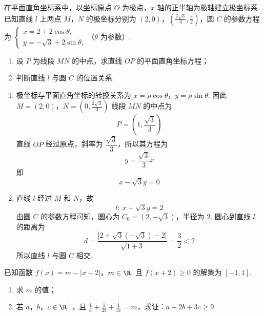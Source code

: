 \begin{problem}
在平面直角坐标系中，以坐标原点 \(O\) 为极点，\(x\) 轴的正半轴为极轴建立极坐标系. 已知直线 \(l\) 上两点 \(M\)，\(N\) 的极坐标分别为 \((2,0)\)，\(\left(\frac{2\sqrt{3}}{3},\frac{\pi}{2}\right)\)，圆 \(C\) 的参数方程为 \(\begin{cases}
x = 2 + 2\cos\theta,\\
y = -\sqrt{3} + 2\sin\theta,
\end{cases}\)（\(\theta\) 为参数）.

\begin{enumerate}
\item 设 \(P\) 为线段 \(MN\) 的中点，求直线 \(OP\) 的平面直角坐标方程；
\item 判断直线 \(l\) 与圆 \(C\) 的位置关系.
\end{enumerate}
\end{problem}

\begin{solution}
\begin{enumerate}
\item 极坐标与平面直角坐标的转换关系为 \(x=\rho\cos\theta\)，\(y=\rho\sin\theta\). 因此
\(M=(2,0)\)，\(N=\left(0,\frac{2\sqrt{3}}{3}\right)\)
线段 \(MN\) 的中点为
\[
P=\left(1,\frac{\sqrt{3}}{3}\right)
\]
直线 \(OP\) 经过原点，斜率为 \(\dfrac{\sqrt{3}}{3}\)，所以其方程为
\[
y=\frac{\sqrt{3}}{3}x
\]
即
\[
x-\sqrt{3}y=0
\]

\item 直线 \(l\) 经过 \(M\) 和 \(N\)，故
\[
l:\ x+\sqrt{3}y=2
\]
由圆 \(C\) 的参数方程可知，圆心为 \(C_{0}=(2,-\sqrt{3})\)，半径为 \(2\). 圆心到直线 \(l\) 的距离为
\[
d=\frac{|2+\sqrt{3}(-\sqrt{3})-2|}{\sqrt{1+3}}
=\frac{3}{2}<2
\]
所以直线 \(l\) 与圆 \(C\) 相交.
\end{enumerate}
\end{solution}

\begin{problem}
已知函数 \(f(x) = m - |x - 2|\)，\(m \in \R\). 且 \(f(x + 2) \geqslant 0\) 的解集为 \([-1,1]\).

\begin{enumerate}
\item 求 \(m\) 的值；
\item 若 \(a\)，\(b\)，\(c \in \R^{+}\)，且 \(\frac{1}{a} + \frac{1}{2b} + \frac{1}{3c} = m\)，求证：\(a + 2b + 3c \geqslant 9\).
\end{enumerate}
\end{problem}

